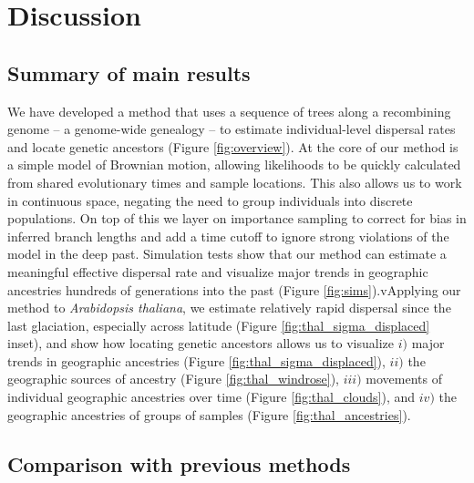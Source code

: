 \documentclass[12pt]{article}
\begin{document}
\section*{Discussion}

\subsection*{Summary of main results}

We have developed a method that uses a sequence of trees along a recombining genome -- a genome-wide genealogy -- to estimate individual-level dispersal rates and locate genetic ancestors (Figure \ref{fig:overview}). At the core of our method is a simple model of Brownian motion, allowing likelihoods to be quickly calculated from shared evolutionary times and sample locations. This also allows us to work in continuous space, negating the need to group individuals into discrete populations. On top of this we layer on importance sampling to correct for bias in inferred branch lengths and add a time cutoff to ignore strong violations of the model in the deep past. Simulation tests show that our method can estimate a meaningful effective dispersal rate and visualize major trends in geographic ancestries hundreds of generations into the past (Figure \ref{fig:sims}).vApplying our method to \textit{Arabidopsis thaliana}, we estimate relatively rapid dispersal since the last glaciation, especially across latitude (Figure \ref{fig:thal_sigma_displaced} inset), and show how locating genetic ancestors allows us to visualize $i)$ major trends in geographic ancestries (Figure \ref{fig:thal_sigma_displaced}), $ii)$ the geographic sources of ancestry (Figure \ref{fig:thal_windrose}), $iii)$ movements of individual geographic ancestries over time (Figure \ref{fig:thal_clouds}), and $iv)$ the geographic ancestries of groups of samples (Figure \ref{fig:thal_ancestries}).

\subsection*{Comparison with previous methods}
\end{document}
